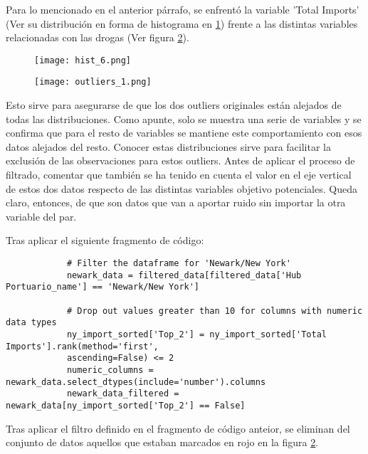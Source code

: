 \documentclass[12pt]{article}
\begin{document}
		Para lo mencionado en el anterior párrafo, se enfrentó la variable 'Total Imports' (Ver su distribución en forma de histograma en \ref{hist_6}) frente a las distintas variables relacionadas con las drogas (Ver figura \ref{outliers_1}). 
		
		\begin{figure}[H]
			\caption{\label{hist_6} }
			\centering
			\hspace*{1cm}
			\texttt{[image: hist\_6.png]}
		\end{figure}
		
		
		
		\begin{figure}[H]
			\caption{\label{outliers_1} }
			\centering
			\hspace*{1cm}
			\texttt{[image: outliers\_1.png]}
		\end{figure}
	
		Esto sirve para asegurarse de que los dos outliers originales están alejados de todas las distribuciones. Como apunte, solo se muestra una serie de variables y se confirma que para el resto de variables se mantiene este comportamiento con esos datos alejados del resto. Conocer estas distribuciones sirve para facilitar la exclusión de las observaciones para estos outliers. Antes de aplicar el proceso de filtrado, comentar que también se ha tenido en cuenta el valor en el eje vertical de estos dos datos respecto de las distintas variables objetivo potenciales. Queda claro, entonces, de que son datos que van a aportar ruido sin importar la otra variable del par.
		
		Tras aplicar el siguiente fragmento de código:
		
		\begin{verbatim}
			# Filter the dataframe for 'Newark/New York'
			newark_data = filtered_data[filtered_data['Hub Portuario_name'] == 'Newark/New York']
			
			# Drop out values greater than 10 for columns with numeric data types
			ny_import_sorted['Top_2'] = ny_import_sorted['Total Imports'].rank(method='first', 
			ascending=False) <= 2
			numeric_columns = newark_data.select_dtypes(include='number').columns
			newark_data_filtered = newark_data[ny_import_sorted['Top_2'] == False]
		\end{verbatim}
	
		Tras aplicar el filtro definido en el fragmento de código anteior, se eliminan del conjunto de datos aquellos que estaban marcados en rojo en la figura \ref{outliers_1}.
		
\end{document}
